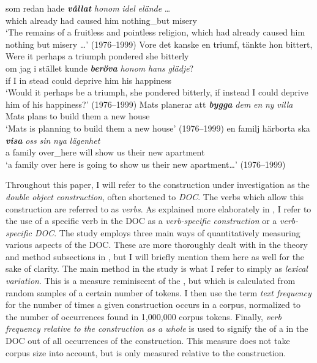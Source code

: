 \documentclass[output=paper]{langscibook}
\begin{document}
\gll som     redan      hade \textbf{\textit{vållat}} \textit{honom}  \textit{idel}        \textit{elände} …\\
  which already    had    caused    him    nothing\_but    misery\\
\glt ‘The remains of a fruitless and pointless religion, which had already caused him nothing but misery …’ (1976--1999)
\ex
\gll Vore   det   kanske    en   triumf,   tänkte       hon bittert,\\
  Were   it perhaps  a    triumph  pondered  she  bitterly  \\

\gll om  jag   i   stället  kunde \textbf{\textit{beröva}} \textit{honom}    \textit{hans}  \textit{glädje}?\\
  if    I      in    stead    could   deprive  him      his    happiness\\
\glt ‘Would it perhaps be a triumph, she pondered bitterly, if instead I could deprive him of his happiness?’ (1976--1999)
\ex
\gll Mats  planerar    att \textbf{\textit{bygga}} \textit{dem}  \textit{en}  \textit{ny}      \textit{villa}\\
  Mats    plans         to    build    them  a    new    house\\
\glt `Mats is planning to build them a new house’ (1976--1999)
\ex \label{ex:valdeson:7}
\gll en    familj    härborta  ska \textbf{\textit{visa}} \textit{oss}   \textit{sin}    \textit{nya}   \textit{lägenhet}\\
  a      family    over\_here  will    show  us   their  new  apartment\\
\glt `a family over here is going to show us their new apartment…’ (1976--1999)
\z


Throughout this paper, I will refer to the construction under investigation as the \textit{double object construction}, often shortened to \textit{DOC}. The verbs which allow this construction are referred to as \textit{ verbs}. As explained more elaborately in , I refer to the use of a specific verb in the DOC as a \textit{verb-specific construction} or a \textit{verb-specific DOC}. The study employs three main ways of quantitatively measuring various aspects of the DOC. These are more thoroughly dealt with in the theory and method subsections in , but I will briefly mention them here as well for the sake of clarity. The main method in the study is what I refer to simply as \textit{lexical variation}. This is a measure reminiscent of the , but which is calculated from random samples of a certain number of tokens. I then use the term \textit{text frequency} for the number of times a given construction occurs in a corpus, normalized to the number of occurrences found in 1,000,000 corpus tokens. Finally, \textit{verb frequency relative to the construction as a whole} is used to signify the  of a  in the DOC out of all occurrences of the construction. This measure does not take corpus size into account, but is only measured relative to the construction.
\end{document}
